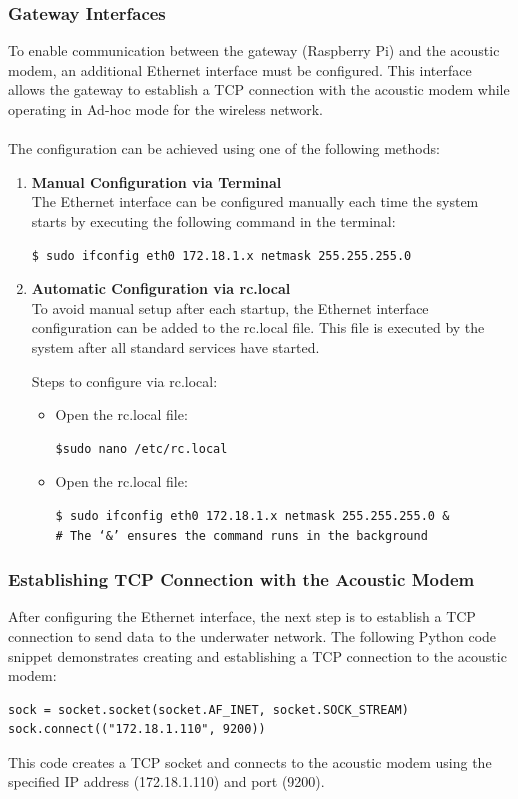 \documentclass[]{nsm-thesis}
\begin{document}
\subsubsection{Gateway Interfaces}
To enable communication between the gateway (Raspberry Pi) and the acoustic modem, an additional Ethernet interface must be configured. This interface allows the gateway to establish a TCP connection with the acoustic modem while operating in Ad-hoc mode for the wireless network.\\\\
The configuration can be achieved using one of the following methods:
\begin{enumerate}
    \item \textbf{Manual Configuration via Terminal}\\
     The Ethernet interface can be configured manually each time the system starts by executing the following command in the terminal:
\begin{lstlisting}
$ sudo ifconfig eth0 172.18.1.x netmask 255.255.255.0 
\end{lstlisting}
\item \textbf{Automatic Configuration via rc.local}\\
To avoid manual setup after each startup, the Ethernet interface configuration can be added to the rc.local file. This file is executed by the system after all standard services have started.

Steps to configure via rc.local:
\begin{itemize}
    \item Open the rc.local file:
    \begin{lstlisting}
$sudo nano /etc/rc.local
\end{lstlisting}
    \item Open the rc.local file:
    \begin{lstlisting}
$ sudo ifconfig eth0 172.18.1.x netmask 255.255.255.0 &
# The ‘&’ ensures the command runs in the background

\end{lstlisting}
\end{itemize}

\end{enumerate}



\subsubsection{Establishing TCP Connection with the Acoustic Modem}
After configuring the Ethernet interface, the next step is to establish a TCP connection to send data to the underwater network. The following Python code snippet demonstrates creating and establishing a TCP connection to the acoustic modem:
\begin{lstlisting}
sock = socket.socket(socket.AF_INET, socket.SOCK_STREAM)
sock.connect(("172.18.1.110", 9200)) 
\end{lstlisting}
This code creates a TCP socket and connects to the acoustic modem using the specified IP address (172.18.1.110) and port (9200).     
\end{document}
